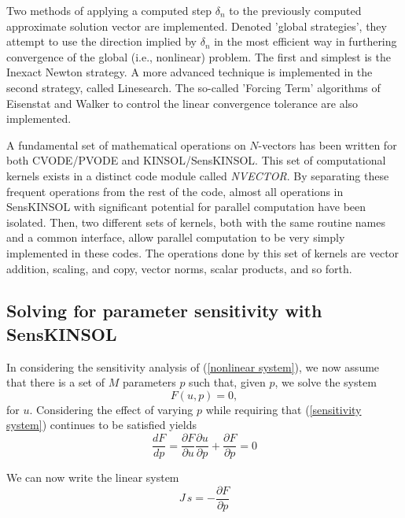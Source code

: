 \documentclass[11pt]{article}
\begin{document}
Two methods of applying a computed step $\delta_n$ to the previously
computed approximate solution vector are implemented. Denoted 'global
strategies', they attempt to use the direction implied by $\delta_n$ in
the most efficient way in furthering convergence of the global (i.e.,
nonlinear) problem. The first and simplest is the Inexact Newton
strategy.  A more advanced technique is implemented in the second
strategy, called Linesearch. The so-called 'Forcing Term' algorithms of
Eisenstat and Walker \cite{EiWa96} to control the linear convergence
tolerance are also implemented.

A fundamental set of mathematical operations on $N$-vectors has been
written for both CVODE/\linebreak[0]PVODE and
KINSOL/\linebreak[0]SensKINSOL. This set of computational kernels
exists in a distinct code module called {\em NVECTOR}. By separating
these frequent operations from the rest of the code, almost all
operations in SensKINSOL with significant potential for parallel
computation have been isolated. Then, two different sets of kernels,
both with the same routine names and a common interface, allow
parallel computation to be very simply implemented in these codes. The
operations done by this set of kernels are vector addition, scaling,
and copy, vector norms, scalar products, and so forth.

\subsection{Solving for parameter sensitivity with SensKINSOL}
\label{subsec:SolvingSens}

In considering the sensitivity analysis of (\ref{nonlinear system}), we
now assume that there is a set of $M$ parameters $p$ such that, given
$p$, we solve the system
\begin{equation}
F(u,p) = 0, \label{sensitivity system}
\end{equation}
for $u$. Considering the effect of varying $p$ while requiring that
(\ref{sensitivity system}) continues to be satisfied yields
\begin{equation}
\frac{{dF}}{{dp}} = \frac{{\partial F}}{{\partial u}}\frac{{\partial
u}}{{\partial p}} + \frac{{\partial F}}{{\partial p}} = 0
\label{sensvariation}
\end{equation}

We can now write the linear system
\begin{equation}
J\,s =  - \frac{{\partial F}}{{\partial p}} \label{eq_sens}
\end{equation}
\end{document}
